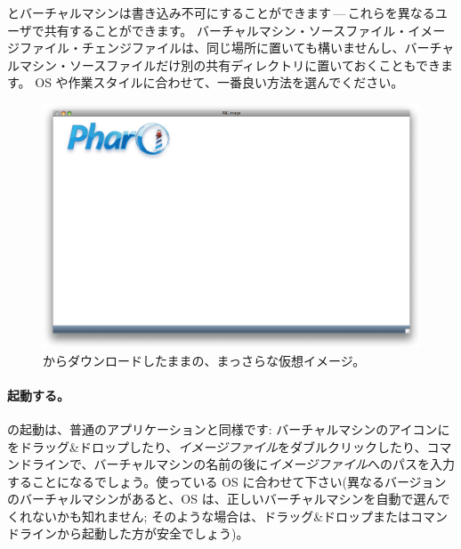 \documentclass[a4paper,10pt,twoside]{book}
\begin{document}
とバーチャルマシンは書き込み不可にすることができます\,---\,これらを異なるユーザで共有することができます。
バーチャルマシン・ソースファイル・イメージファイル・チェンジファイルは、同じ場所に置いても構いませんし、バーチャルマシン・ソースファイルだけ別の共有ディレクトリに置いておくこともできます。
OS や作業スタイルに合わせて、一番良い方法を選んでください。


\begin{figure}[htb]
\centerline {\includegraphics[width=\textwidth]{startup}}
\caption{\pbe からダウンロードしたままの、まっさらな仮想イメージ。}
\end{figure}

\paragraph{起動する。} \pharo の起動は、普通のアプリケーションと同様です: バーチャルマシンのアイコンにをドラッグ\&ドロップしたり、\emph{イメージファイル}をダブルクリックしたり、コマンドラインで、バーチャルマシンの名前の後に\emph{イメージファイル}へのパスを入力することになるでしょう。使っている OS に合わせて下さい(異なるバージョンのバーチャルマシンがあると、OS は、正しいバーチャルマシンを自動で選んでくれないかも知れません; そのような場合は、ドラッグ\&ドロップまたはコマンドラインから起動した方が安全でしょう)。
\end{document}
